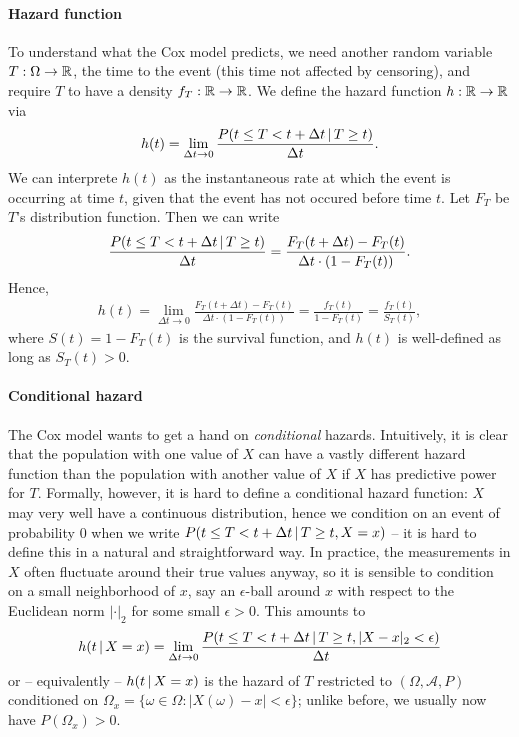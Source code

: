 \paragraph{Hazard function} To understand what the Cox model predicts, we need another random 
variable $T: \Omega \to \mathbb{R}$, the time to the event (this time not affected by censoring), and 
require $T$ to have a density $f_T: \mathbb{R} \to \mathbb{R}$. We define the hazard function $h: \mathbb{R} \to \mathbb{R}$
via
\begin{align}
    h(t) = \lim_{\Delta t \to 0} \frac{P(t \leq T < t + \Delta t \,|\, T \geq t)}{\Delta t}.
\end{align}
We can interprete $h(t)$ as the instantaneous rate at which the event is occurring at time $t$, 
given that the event has not occured before time $t$. Let $F_T$ be $T$'s distribution function. Then 
we can write
\begin{align}
    \frac{P(t \leq T < t + \Delta t \,|\, T \geq t)}{\Delta t} = 
    \frac{F_T(t + \Delta t) - F_T(t)}{\Delta t \cdot (1 - F_T(t))}.
\end{align}
Hence, 
\begin{align}
    h(t) = \lim_{\Delta t \to 0} \frac{F_T(t + \Delta t) - F_T(t)}{\Delta t \cdot (1 - F_T(t))} 
    = \frac{f_T(t)}{1 - F_T(t)} = \frac{f_T(t)}{S_T(t)},
\end{align}
where $S(t) = 1 - F_T(t)$ is the survival function, and $h(t)$ is well-defined as long as $S_T(t)
> 0$.

\paragraph{Conditional hazard} The Cox model wants to get a hand on \textit{conditional} hazards.
Intuitively, it is clear that the population with one value of $X$ can have a vastly different 
hazard function than the population with another value of $X$ if $X$ has predictive power for $T$.
Formally, however, it is hard to define a conditional hazard function: $X$ may very well 
have a continuous distribution, hence we condition on an event of probability $0$ when we write 
$P(t \leq T < t + \Delta t \,|\, T \geq t, X = x)$ -- it is hard to define this in a natural
and straightforward way. In practice, the measurements in $X$ often fluctuate around their true 
values anyway, so it is sensible to condition on a small neighborhood of $x$, say an $\epsilon$-ball 
around $x$ with respect to the Euclidean norm $|\cdot|_2$ for some small $\epsilon > 0$. This 
amounts to
\begin{align}
    h(t \,|\, X = x) = \lim_{\Delta t \to 0} \frac{P(t \leq T < t + \Delta t \,|\, T \geq t, 
    |X - x|_2 < \epsilon)}{\Delta t}
\end{align}
or -- equivalently -- $h(t \,|\, X = x)$ is the hazard of $T$ restricted to $(\Omega, \mathcal{A}, 
P)$ conditioned on $\Omega_x = \{ \omega \in \Omega: |X(\omega) - x| < \epsilon \}$; unlike before, 
we usually now have $P(\Omega_x) > 0$.

